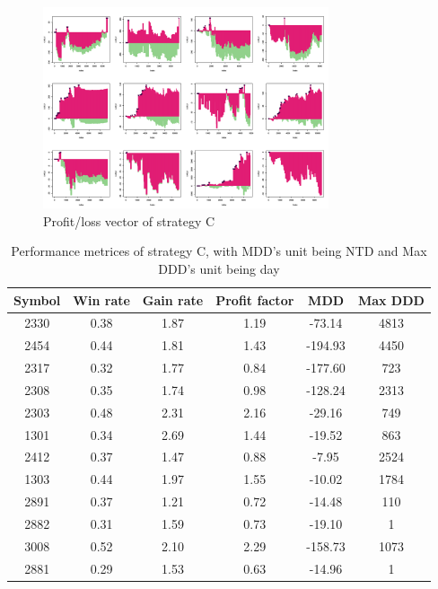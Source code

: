 \documentclass[12pt, letterpaper, oneside]{article}
\begin{document}
\begin{figure}[h]
    \centering
    \includegraphics[width=0.75\textwidth]{sc_pl}
    \caption{Profit/loss vector of strategy C}
    \label{fig:c}
\end{figure}

\begin{table}[h!]
    \centering
    \begin{tabular}{ |c|c|c|c|c|c| }
        \hline
        Symbol & Win rate & Gain rate & Profit factor & MDD & Max DDD \\ [0.5ex]
        \hline
        2330 & 0.38 & 1.87 & 1.19 & -73.14 & 4813 \\
        2454 & 0.44 & 1.81 & 1.43 & -194.93 & 4450 \\
        2317 & 0.32 & 1.77 & 0.84 & -177.60 & 723 \\
        2308 & 0.35 & 1.74 & 0.98 & -128.24 & 2313 \\
        2303 & 0.48 & 2.31 & 2.16 & -29.16 & 749 \\
        1301 & 0.34 & 2.69 & 1.44 & -19.52 & 863 \\
        2412 & 0.37 & 1.47 & 0.88 & -7.95 & 2524 \\
        1303 & 0.44 & 1.97 & 1.55 & -10.02 & 1784 \\
        2891 & 0.37 & 1.21 & 0.72 & -14.48 & 110 \\
        2882 & 0.31 & 1.59 & 0.73 & -19.10 & 1 \\
        3008 & 0.52 & 2.10 & 2.29 & -158.73 & 1073 \\
        2881 & 0.29 & 1.53 & 0.63 & -14.96 & 1 \\ [0.5ex]
        \hline
    \end{tabular}
    \caption{Performance metrices of strategy C, with MDD's unit being NTD and Max DDD's unit being day}
    \label{table:c}
\end{table}
\end{document}
